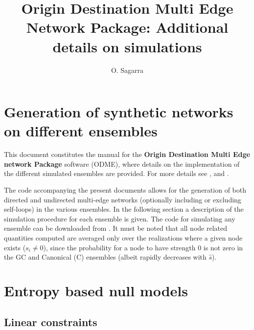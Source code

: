 \documentclass[aps,floatfix,noshowpacs,superscriptaddress]{revtex4}
\begin{document}
\title{Origin Destination Multi Edge Network Package: Additional details on simulations}
\author{O. Sagarra}


\maketitle

\section{Generation of synthetic networks on different ensembles}
\label{app_simus}

This document constitutes the manual for the \textbf{Origin Destination Multi Edge network Package} software (ODME), where details on the implementation of the different simulated ensembles are provided. For more details see \cite{Sagarra2013c}, \cite{Sagarra2014} and \cite{Supersampling}. %


The code accompanying the present documents allows for the generation of both directed and undirected multi-edge networks (optionally including or excluding self-loops) in the various ensembles. In the following section a description of the simulation procedure for each ensemble is given. The code for simulating any ensemble can be downloaded from \cite{github}. %
It must be noted that all node related quantities computed are averaged only over the realizations where a given node exists ($s_i\neq 0$), since the probability for a node to have strength $0$ is not zero in the GC and Canonical (C) ensembles (albeit rapidly decreases with $\hat{s}$). 

\section{Entropy based null models}
\subsection{Linear constraints}
\end{document}

